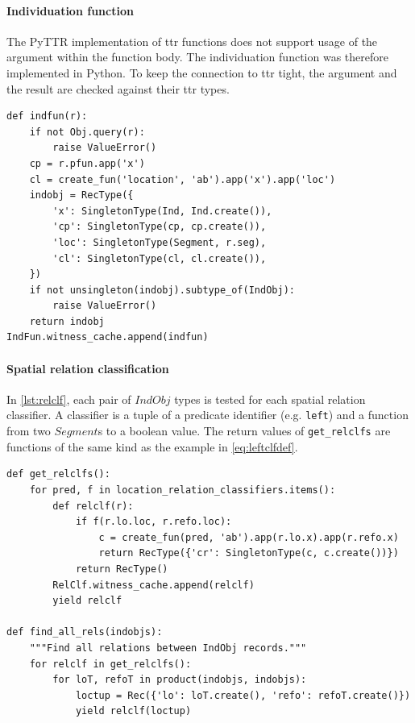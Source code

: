 \paragraph{Individuation function}

The PyTTR implementation of \gls{ttr} functions does not support usage of the argument within the function body.
The individuation function was therefore implemented in Python.
To keep the connection to \gls{ttr} tight, the argument and the result are checked against their \gls{ttr} types.

\begin{lstlisting}[label={lst:indfun},caption={Individuation function}]
def indfun(r):
    if not Obj.query(r):
        raise ValueError()
    cp = r.pfun.app('x')
    cl = create_fun('location', 'ab').app('x').app('loc')
    indobj = RecType({
        'x': SingletonType(Ind, Ind.create()),
        'cp': SingletonType(cp, cp.create()),
        'loc': SingletonType(Segment, r.seg),
        'cl': SingletonType(cl, cl.create()),
    })
    if not unsingleton(indobj).subtype_of(IndObj):
        raise ValueError()
    return indobj
IndFun.witness_cache.append(indfun)
\end{lstlisting}

\paragraph{Spatial relation classification}

In \autoref{lst:relclf}, each pair of $IndObj$ types is tested for each spatial relation classifier.
A classifier is a tuple of a predicate identifier (e.g. {\tt left}) and a function from two $Segment$s to a boolean value.
The return values of {\tt get\_relclfs} are functions of the same kind as the example in \autoref{eq:leftclfdef}.

\begin{lstlisting}[label=lst:relclf, caption=Spatial relation classifiers]
def get_relclfs():
    for pred, f in location_relation_classifiers.items():
        def relclf(r):
            if f(r.lo.loc, r.refo.loc):
                c = create_fun(pred, 'ab').app(r.lo.x).app(r.refo.x)
                return RecType({'cr': SingletonType(c, c.create())})
            return RecType()
        RelClf.witness_cache.append(relclf)
        yield relclf

def find_all_rels(indobjs):
    """Find all relations between IndObj records."""
    for relclf in get_relclfs():
        for loT, refoT in product(indobjs, indobjs):
            loctup = Rec({'lo': loT.create(), 'refo': refoT.create()})
            yield relclf(loctup)
\end{lstlisting}


